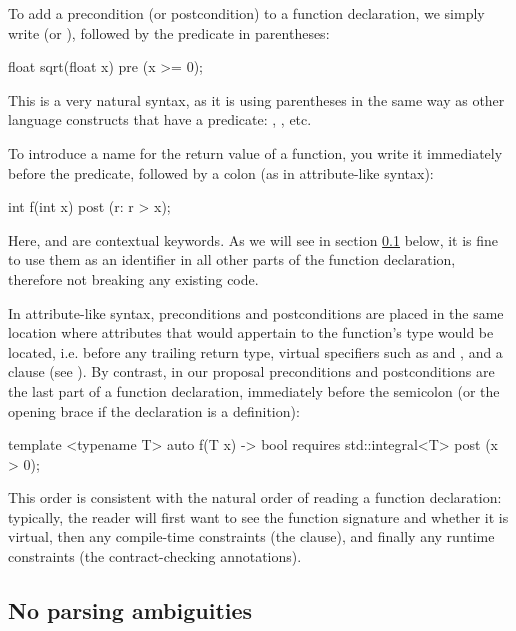 To add a precondition (or postcondition) to a function declaration, we simply write  (or ), followed by the predicate in parentheses:
\begin{codeblock}
float sqrt(float x)
  pre (x >= 0);
\end{codeblock}
This is a very natural syntax, as it is using parentheses in the same way as other language constructs that have a predicate: , , etc.

To introduce a name for the return value of a function, you write it immediately before the predicate, followed by a colon (as in attribute-like syntax):

\begin{codeblock}
int f(int x)
  post (r: r > x);
\end{codeblock}

Here,  and  are contextual keywords. As we will see in section \ref{subsec:noambig} below, it is fine to use them as an identifier in all other parts of the function declaration, therefore not breaking any existing code.

In attribute-like syntax, preconditions and postconditions are placed in the same location where attributes that would appertain to the function’s type would be located, i.e. before any trailing return type, virtual specifiers such as  and , and a  clause (see \cite{P2935R0}). By contrast, in our proposal preconditions and postconditions are the last part of a function declaration, immediately before the semicolon (or the opening brace if the declaration is a definition):

\begin{codeblock}
template <typename T>
auto f(T x) -> bool
  requires std::integral<T>
  post (x > 0);
\end{codeblock}

This order is consistent with the natural order of reading a function declaration: typically, the reader will first want to see the function signature and whether it is virtual, then any compile-time constraints (the  clause), and finally any runtime constraints (the contract-checking annotations).

\subsection{No parsing ambiguities}
\label{subsec:noambig}

